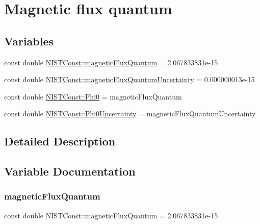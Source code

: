 \hypertarget{group___magnetic_flux_quantum}{}\section{Magnetic flux quantum}
\label{group___magnetic_flux_quantum}
\subsection*{Variables}
\begin{DoxyCompactItemize}
\item 
const double \hyperlink{group___magnetic_flux_quantum_ga2ed9e5fb19a6f2cc0c25ad945ea6b562}{N\+I\+S\+T\+Const\+::magnetic\+Flux\+Quantum} = 2.\+067833831e-\/15
\item 
const double \hyperlink{group___magnetic_flux_quantum_gabb501bffb2a565762d9f4bde15f859b6}{N\+I\+S\+T\+Const\+::magnetic\+Flux\+Quantum\+Uncertainty} = 0.\+000000013e-\/15
\item 
const double \hyperlink{group___magnetic_flux_quantum_ga17c4e5dc1a9ccc86990f9236ffbc42a3}{N\+I\+S\+T\+Const\+::\+Phi0} = magnetic\+Flux\+Quantum
\item 
const double \hyperlink{group___magnetic_flux_quantum_ga55c653d0966d0e6adb13e664c811d394}{N\+I\+S\+T\+Const\+::\+Phi0\+Uncertainty} = magnetic\+Flux\+Quantum\+Uncertainty
\end{DoxyCompactItemize}


\subsection{Detailed Description}


\subsection{Variable Documentation}
\mbox{\label{group___magnetic_flux_quantum_ga2ed9e5fb19a6f2cc0c25ad945ea6b562}} 
\subsubsection{\texorpdfstring{magnetic\+Flux\+Quantum}{magneticFluxQuantum}}
{\footnotesize\ttfamily const double N\+I\+S\+T\+Const\+::magnetic\+Flux\+Quantum = 2.\+067833831e-\/15}

